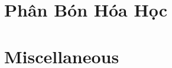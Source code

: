 \documentclass{article}
\begin{document}

\section{Phân Bón Hóa Học}


\section{Miscellaneous}


\printbibliography[heading=bibintoc]
	
\end{document}

